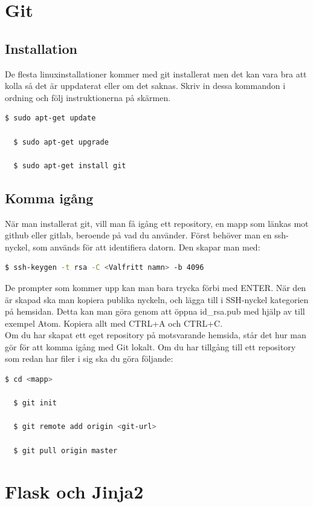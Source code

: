 \documentclass{TDP003mall}
\begin{document}
\section{Git}
\subsection{Installation}
De flesta linuxinstallationer kommer med git installerat men det kan vara bra att
kolla så det är uppdaterat eller om det saknas. Skriv in dessa kommandon i ordning
och följ instruktionerna på skärmen.

\begin{lstlisting}[language=bash]
  $ sudo apt-get update

  $ sudo apt-get upgrade

  $ sudo apt-get install git
\end{lstlisting}

\subsection{Komma igång}
När man installerat git, vill man få igång ett repository, en mapp som länkas mot github
eller gitlab, beroende på vad du använder. Först behöver man en ssh-nyckel, som används
för att identifiera datorn. Den skapar man med:
\begin{lstlisting}[language=bash]
  $ ssh-keygen -t rsa -C <Valfritt namn> -b 4096
\end{lstlisting}
De prompter som kommer upp kan man bara trycka förbi med ENTER. När den är skapad
ska man kopiera publika nyckeln, och lägga till i SSH-nyckel kategorien på hemsidan.
Detta kan man göra genom att öppna id\_rsa.pub med hjälp av till exempel Atom. Kopiera
allt med CTRL+A och CTRL+C.\\
Om du har skapat ett eget repository på motsvarande
hemsida, står det hur man gör för att komma igång med Git lokalt. Om du har tillgång
till ett repository som redan har filer i sig ska du göra följande:
\begin{lstlisting}[language=bash]
  $ cd <mapp>

  $ git init

  $ git remote add origin <git-url>

  $ git pull origin master
\end{lstlisting}

\section{Flask och Jinja2}
\end{document}
